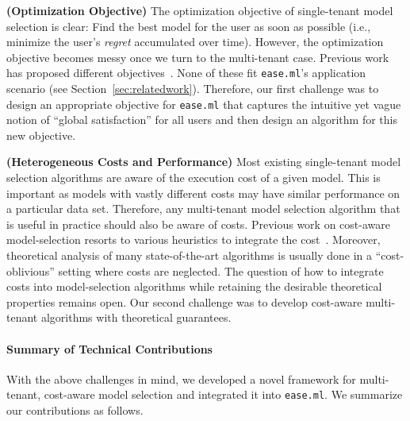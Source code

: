 \documentclass[letterpaper]{vldb}
\newcommand{\eml}{\texttt{ease.ml}\xspace}
\begin{document}
\noindent
{\bf (Optimization Objective)}
The optimization objective of single-tenant model selection is clear: Find the best model for the user as soon as 
possible (i.e., minimize the user's {\em regret} accumulated over time).
However, the optimization objective becomes messy once we turn to the multi-tenant case.
Previous work has proposed different objectives~\cite{Swersky2013}.
None of these fit \eml's application scenario (see Section~\ref{sec:relatedwork}).
Therefore, our first challenge was to design an appropriate objective for \eml that captures the intuitive yet vague notion of ``global satisfaction'' for all users and then design 
an algorithm for this new objective.
 

\noindent
{\bf (Heterogeneous Costs and Performance)} Most
existing single-tenant model selection
 algorithms are aware of the execution cost of
  a given model. This is important as models with
  vastly different costs may have similar performance 
  on a particular data set. Therefore, any multi-tenant
  model selection algorithm that is useful in practice should also
  be aware of costs.
  Previous work on cost-aware model-selection resorts to various heuristics to integrate the cost~\cite{Snoek2012}.
  Moreover, theoretical analysis of many state-of-the-art algorithms is usually done in a ``cost-oblivious'' setting where costs are neglected.
  The question of how to integrate costs into model-selection algorithms while retaining the desirable theoretical properties remains open.
  Our second challenge was to develop cost-aware multi-tenant algorithms with theoretical guarantees.
  
\vspace{-1em}
\paragraph*{Summary of Technical Contributions}


With the above challenges in mind, we developed a novel framework for multi-tenant, cost-aware model selection and integrated it into \eml. We summarize our contributions as follows.
\end{document}
